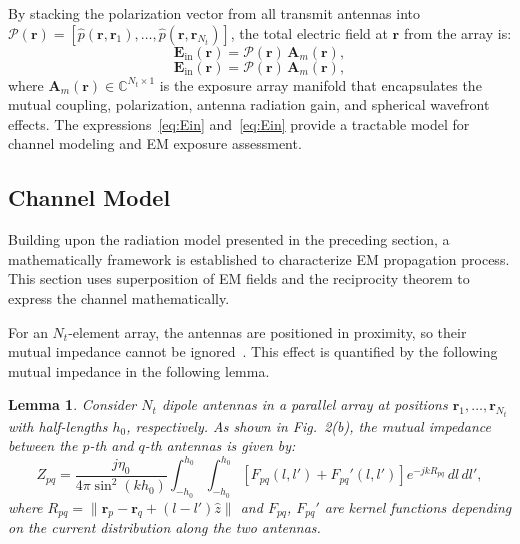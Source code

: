 \documentclass[journal]{IEEEtran}
\newtheorem{lemma}{Lemma}
\begin{document}
By stacking the polarization vector from all transmit antennas into $\mathcal{P}(\mathbf{r}) = [\hat{p}(\mathbf{r}, \mathbf{r}_1), \ldots, \hat{p}(\mathbf{r}, \mathbf{r}_{N_t})]$, the total electric field at $\mathbf{r}$ from the array is:
\begin{equation}
    \mathbf{E}_{\mathrm{in}}(\mathbf{r}) = \mathcal{P}(\mathbf{r})\, \mathbf{A}_m(\mathbf{r}),
    \label{eq:Ein}
\end{equation}
\begin{equation}
    \mathbf{E}_{\mathrm{in}}(\mathbf{r}) = \mathcal{P}(\mathbf{r})\, \mathbf{A}_m(\mathbf{r}),
\end{equation}
where $\mathbf{A}_m(\mathbf{r}) \in \mathbb{C}^{N_t \times 1}$ is the exposure array manifold that encapsulates the mutual coupling, polarization, antenna radiation gain, and spherical wavefront effects. The expressions~\eqref{eq:Ein} and~\eqref{eq:Ein} provide a tractable model for channel modeling and EM exposure assessment.

\subsection{Channel Model}

Building upon the radiation model presented in the preceding section, a mathematically framework is established to characterize EM propagation process. This section uses superposition of EM fields and the reciprocity theorem to express the channel mathematically.

For an $N_t$-element array, the antennas are positioned in proximity, so their mutual impedance cannot be ignored~\cite{ref24}. This effect is quantified by the following mutual impedance in the following lemma.

\begin{lemma}
Consider $N_t$ dipole antennas in a parallel array at positions $\mathbf{r}_1, \ldots, \mathbf{r}_{N_t}$ with half-lengths $h_0$, respectively. As shown in Fig.~2(b), the mutual impedance between the $p$-th and $q$-th antennas is given by:
\begin{equation}
    Z_{pq} = \frac{j\eta_0}{4\pi\sin^2(kh_0)}\int_{-h_0}^{h_0}\int_{-h_0}^{h_0}
    \left[F_{pq}(l, l') + F_{pq}'(l, l')\right]e^{-jkR_{pq}}\,dl\,dl',
\end{equation}
where $R_{pq} = \|\mathbf{r}_p - \mathbf{r}_q + (l - l')\hat{z}\|$ and $F_{pq}$, $F_{pq}'$ are kernel functions depending on the current distribution along the two antennas.
\end{lemma}
\end{document}
